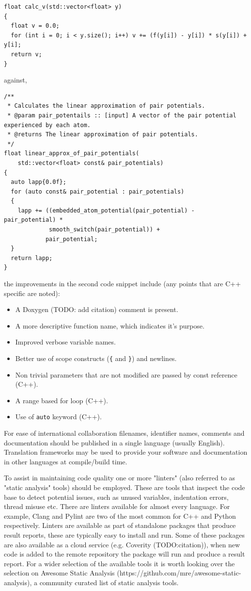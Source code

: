 \documentclass[jnr]{iosart2x}
\begin{document}
\begin{itemzie}
\begin{lstlisting}
float calc_v(std::vector<float> y)
{
  float v = 0.0;
  for (int i = 0; i < y.size(); i++) v += (f(y[i]) - y[i]) * s(y[i]) + y[i];
  return v;
}
\end{lstlisting}

against,

\begin{lstlisting}
/**
 * Calculates the linear approximation of pair potentials.
 * @param pair_potentails :: [input] A vector of the pair potential experienced by each atom.
 * @returns The linear approximation of pair potentials.
 */
float linear_approx_of_pair_potentials(
    std::vector<float> const& pair_potentials)
{
  auto lapp{0.0f};
  for (auto const& pair_potential : pair_potentials)
  {
    lapp += ((embedded_atom_potential(pair_potential) - pair_potential) *
             smooth_switch(pair_potential)) +
            pair_potential;
  }
  return lapp;
}
\end{lstlisting}

the improvements in the second code snippet include (any points that are C++ specific are noted):
\begin{itemize}
  \item{A Doxygen \cite{} (TODO: add citation) comment is present.}
  \item{A more descriptive function name, which indicates it's purpose.}
  \item{Improved verbose variable names.}
  \item{Better use of scope constructs (\texttt{\{} and \texttt{\}}) and newlines.}
  \item{Non trivial parameters that are not modified are passed by const reference (C++).}
  \item{A range based for loop (C++).}
  \item{Use of \texttt{auto} keyword (C++).}
\end{itemize}

For ease of international collaboration filenames, identifier names, comments and documentation should be published in a single language (usually English).
Translation frameworks may be used to provide your software and documentation in other languages at compile/build time.

To assist in maintaining code quality one or more "linters" (also referred to as "static analysis" tools) should be employed.
These are tools that inspect the code base to detect potential issues, such as unused variables, indentation errors, thread misuse etc.
There are linters available for almost every language.
For example, Clang \cite{Clang} and Pylint \cite{Pylint} are two of the most common for C++ and Python respectively.
Linters are available as part of standalone packages that produce result reports, these are typically easy to install and run.
Some of these packages are also available as a cloud service (e.g. Coverity \cite{} (TODO:citation)), when new code is added to the remote repository the package will run and produce a result report.
For a wider selection of the available tools it is worth looking over the selection on Awesome Static Analysis (https://github.com/mre/awesome-static-analysis), a community curated list of static analysis tools.


\end{itemzie}
\end{document}
